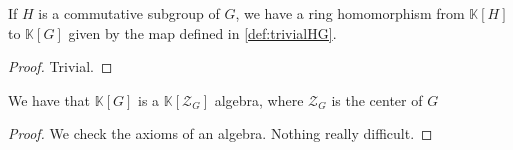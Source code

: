 \begin{definition}
    \label{def:RingHomkHkG}
    \leanok
    If $H$ is a commutative subgroup of $G$, we have a ring homomorphism
    from $\mathbb{K}[H]$ to $\mathbb{K}[G]$ given by the map defined in \ref{def:trivialHG}.
\end{definition}
\begin{proof}
    \leanok
    Trivial.
\end{proof}

\begin{proposition}
    \label{prop:kG_is_kH_Algebra}
    \leanok
    We have that $\mathbb{K}[G]$ is a $\mathbb{K}[\mathcal{Z}_G]$
    algebra, where $\mathcal{Z}_G$ is the center of $G$
\end{proposition}
\begin{proof}
    \leanok
    We check the axioms of an algebra. Nothing really difficult.
\end{proof}